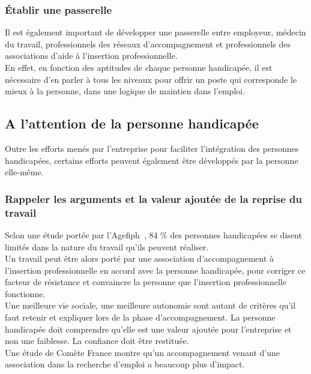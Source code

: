 \subsubsection{Établir une passerelle}
Il est également important de développer une passerelle entre employeur, médecin du travail, professionnels des réseaux d'accompagnement et professionnels des associations d'aide à l'insertion professionnelle.\\

En effet, en fonction des aptitudes de chaque personne handicapée, il est nécessaire d'en parler à tous les niveaux pour offrir un poste qui corresponde le mieux à la personne, dans une logique de maintien dans l'emploi.

\subsection{A l'attention de la personne handicapée}

Outre les efforts menés par l'entreprise pour faciliter l'intégration des personnes handicapées, certains efforts peuvent également être développés par la personne elle-même.

\subsubsection{Rappeler les arguments et la valeur ajoutée de la reprise du travail}

Selon une étude portée par l'Agefiph~\cite{tendances2}, 84 \% des personnes handicapées se disent limités dans la nature du travail qu'ils peuvent réaliser.\\
Un travail peut être alors porté par une association d'accompagnement à l'insertion professionnelle en accord avec la personne handicapée, pour corriger ce facteur de résistance et convaincre la personne que l'insertion professionnelle fonctionne.\\
Une meilleure vie sociale, une meilleure autonomie sont autant de critères qu'il faut retenir et expliquer lors de la phase d'accompagnement. La personne handicapée doit comprendre qu'elle est une valeur ajoutée pour l'entreprise et non une faiblesse. La confiance doit être restituée. \\

Une étude de Comète France montre qu'un accompagnement venant d'une association dans la recherche d'emploi a beaucoup plus d'impact.\\

